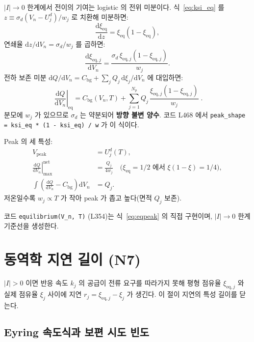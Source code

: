 \documentclass[11pt,a4paper]{article}
\newcommand{\dd}{\mathrm{d}}
\newcommand{\eq}{\mathrm{eq}}
\newcommand{\bg}{\mathrm{bg}}
\newcommand{\peak}{\mathrm{peak}}
\begin{document}
$|I|\to0$ 한계에서 전이의 기여는 logistic 의 전위 미분이다. 식~\eqref{eq:ksi_eq}
를 $z \equiv \sigma_d(V_n-U_j^d)/w_j$ 로 치환해 미분하면:
\begin{equation}
\frac{\dd\xi_\eq}{\dd z} = \xi_\eq(1-\xi_\eq),
\end{equation}
연쇄율 $\dd z/\dd V_n = \sigma_d/w_j$ 를 곱하면:
\begin{equation}
\frac{\dd\xi_{\eq,j}}{\dd V_n} = \frac{\sigma_d\,\xi_{\eq,j}(1-\xi_{\eq,j})}{w_j}.
\label{eq:dxidV}
\end{equation}
전하 보존 미분 $\dd Q/\dd V_n = C_\bg + \sum_j Q_j\,\dd\xi_j/\dd V_n$ 에 대입하면:
\begin{equation}
\boxed{\;\left.\frac{\dd Q}{\dd V_n}\right|_\eq
= C_\bg(V_n,T)
+ \sum_{j=1}^{N_p} Q_j\,\frac{\xi_{\eq,j}(1-\xi_{\eq,j})}{w_j}\;.}
\label{eq:eqpeak}
\end{equation}
분모에 $w_j$ 가 있으므로 $\sigma_d$ 는 약분되어 \textbf{방향 불변 양수}.
코드 L468 에서 \texttt{peak\_shape = ksi\_eq * (1 - ksi\_eq) / w} 가 이 식이다.

Peak 의 세 특성:
\begin{align}
V_\peak &= U_j^d(T), \label{eq:peakpos}\\
\left.\frac{\dd Q}{\dd V_n}\right|_{\max}^\mathrm{net} &= \frac{Q_j}{4w_j}\quad\text{($\xi_\eq=1/2$ 에서 $\xi(1-\xi)=1/4$)},\label{eq:peakheight}\\
\int\!\left(\frac{\dd Q}{\dd V_n} - C_\bg\right)\dd V_n &= Q_j.\label{eq:peakarea}
\end{align}
저온일수록 $w_j\propto T$ 가 작아 peak 가 좁고 높다(면적 $Q_j$ 보존).

코드 \texttt{equilibrium(V\_n, T)} (L354)는 식~\eqref{eq:eqpeak} 의 직접 구현이며,
$|I|\to0$ 한계 기준선을 생성한다.

\section{동역학 지연 길이 (N7)}\label{sec:kinlag}

$|I|>0$ 이면 반응 속도 $k_j$ 의 공급이 전류 요구를 따라가지 못해 평형 점유율
$\xi_{\eq,j}$ 와 실제 점유율 $\xi_j$ 사이에 지연 $r_j = \xi_{\eq,j} - \xi_j$ 가
생긴다. 이 절이 지연의 특성 길이를 닫는다.

\subsection{Eyring 속도식과 보편 시도 빈도}
\end{document}
